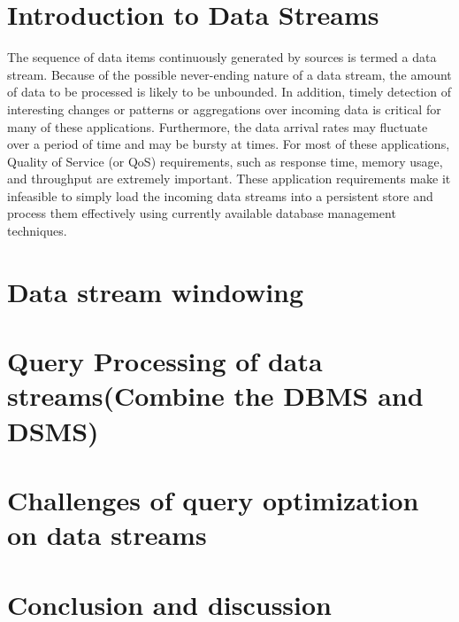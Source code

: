 \section{Introduction to Data Streams}
The sequence of data items continuously generated by sources is termed a data stream. Because of the possible never-ending nature of a data stream, the amount of data to be processed is likely to be unbounded. In addition, timely detection of interesting changes or patterns or aggregations over incoming data is critical for many of these applications. Furthermore, the data arrival rates may fluctuate over a period of time and may be bursty at times. For most of these applications, Quality of Service (or QoS) requirements, such as response time, memory usage, and throughput are extremely important. These application requirements make it infeasible to simply load the incoming data streams into a persistent store and process them effectively using currently available database management techniques.

\section{Data stream windowing}


\section{Query Processing of data streams(Combine the DBMS and DSMS)}


\section{Challenges of query optimization on data streams}


\section{Conclusion and discussion}



